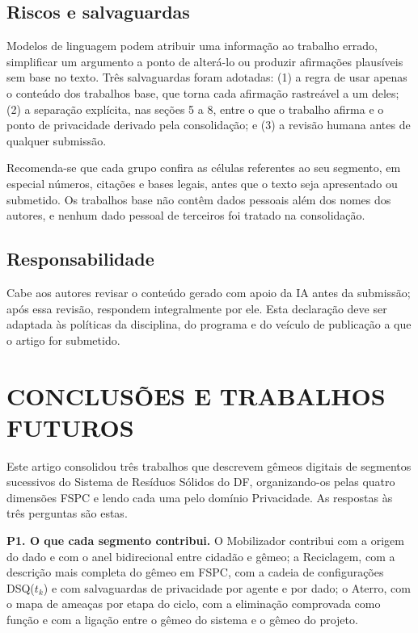 \documentclass[12pt,a4paper,article,oneside,english,brazil]{abntex2}
\newcommand{\dsq}[1]{DSQ($t_{#1}$)}
\begin{document}
\subsection{Riscos e salvaguardas}

Modelos de linguagem podem atribuir uma informação ao trabalho errado, simplificar um argumento a ponto de alterá-lo ou produzir afirmações plausíveis sem base no texto. Três salvaguardas foram adotadas: (1) a regra de usar apenas o conteúdo dos trabalhos base, que torna cada afirmação rastreável a um deles; (2) a separação explícita, nas seções 5 a 8, entre o que o trabalho afirma e o ponto de privacidade derivado pela consolidação; e (3) a revisão humana antes de qualquer submissão.

Recomenda-se que cada grupo confira as células referentes ao seu segmento, em especial números, citações e bases legais, antes que o texto seja apresentado ou submetido. Os trabalhos base não contêm dados pessoais além dos nomes dos autores, e nenhum dado pessoal de terceiros foi tratado na consolidação.

\subsection{Responsabilidade}

Cabe aos autores revisar o conteúdo gerado com apoio da IA antes da submissão; após essa revisão, respondem integralmente por ele. Esta declaração deve ser adaptada às políticas da disciplina, do programa e do veículo de publicação a que o artigo for submetido.

\section{CONCLUSÕES E TRABALHOS FUTUROS}

Este artigo consolidou três trabalhos que descrevem gêmeos digitais de segmentos sucessivos do Sistema de Resíduos Sólidos do DF, organizando-os pelas quatro dimensões FSPC e lendo cada uma pelo domínio Privacidade. As respostas às três perguntas são estas.

\textbf{P1. O que cada segmento contribui.} O Mobilizador contribui com a origem do dado e com o anel bidirecional entre cidadão e gêmeo; a Reciclagem, com a descrição mais completa do gêmeo em FSPC, com a cadeia de configurações \dsq{k} e com salvaguardas de privacidade por agente e por dado; o Aterro, com o mapa de ameaças por etapa do ciclo, com a eliminação comprovada como função e com a ligação entre o gêmeo do sistema e o gêmeo do projeto.
\end{document}
